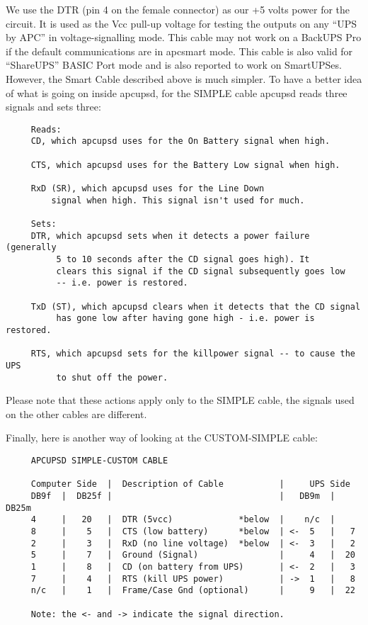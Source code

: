 We use the DTR (pin 4 on the female connector) as our +5 volts power for the
circuit. It is used as the Vcc pull-up voltage for testing the outputs on any
``UPS by APC'' in voltage-signalling mode.  This cable may not work on a
BackUPS Pro if the default communications are in apcsmart mode. This cable is
also valid for ``ShareUPS'' BASIC Port mode and is also reported to work on
SmartUPSes. However, the Smart Cable described above is much simpler. To have
a better idea of what is going on inside apcupsd, for the SIMPLE cable apcupsd
reads three signals and sets three: 

\footnotesize
\begin{verbatim}
     Reads:
     CD, which apcupsd uses for the On Battery signal when high.
     
     CTS, which apcupsd uses for the Battery Low signal when high.
     
     RxD (SR), which apcupsd uses for the Line Down
         signal when high. This signal isn't used for much.
     
     Sets:
     DTR, which apcupsd sets when it detects a power failure (generally
          5 to 10 seconds after the CD signal goes high). It
          clears this signal if the CD signal subsequently goes low
          -- i.e. power is restored.
     
     TxD (ST), which apcupsd clears when it detects that the CD signal
          has gone low after having gone high - i.e. power is restored.
     
     RTS, which apcupsd sets for the killpower signal -- to cause the UPS
          to shut off the power.
\end{verbatim}
\normalsize

Please note that these actions apply only to the SIMPLE cable, the signals
used on the other cables are different.  

Finally, here is another way of looking at the CUSTOM-SIMPLE cable: 

\footnotesize
\begin{verbatim}
     APCUPSD SIMPLE-CUSTOM CABLE
     
     Computer Side  |  Description of Cable           |     UPS Side
     DB9f  |  DB25f |                                 |   DB9m  | DB25m
     4     |   20   |  DTR (5vcc)             *below  |    n/c  |
     8     |    5   |  CTS (low battery)      *below  | <-  5   |   7
     2     |    3   |  RxD (no line voltage)  *below  | <-  3   |   2
     5     |    7   |  Ground (Signal)                |     4   |  20
     1     |    8   |  CD (on battery from UPS)       | <-  2   |   3
     7     |    4   |  RTS (kill UPS power)           | ->  1   |   8
     n/c   |    1   |  Frame/Case Gnd (optional)      |     9   |  22
     
     Note: the <- and -> indicate the signal direction.
\end{verbatim}
\normalsize

